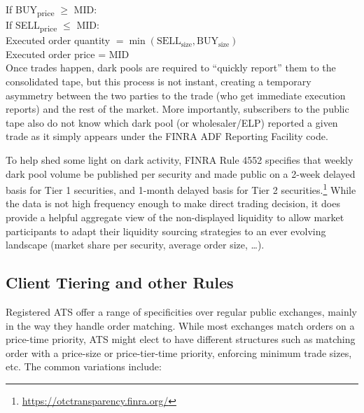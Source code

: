 \noindent If BUY\textsubscript{price} $\geq$ MID: \\
\indent If SELL\textsubscript{price} $\leq$ MID: \\
\indent\indent Executed order quantity $= \min(\text{SELL}_{\text{size}}, \text{BUY}_{\text{size}})$ \\
\indent\indent Executed order price = MID \\


Once trades happen, dark pools are required to ``quickly report'' them to the consolidated tape, but this process is not instant, creating a temporary asymmetry between the two parties to the trade (who get immediate execution reports) and the rest of the market. More importantly, subscribers to the public tape also do not know which dark pool (or wholesaler/ELP) reported a given trade as it simply appears under the FINRA ADF Reporting Facility code.


To help shed some light on dark activity, FINRA Rule 4552 specifies that weekly dark pool volume be published per security and made public on a 2-week delayed basis for Tier 1 securities, and 1-month delayed basis for Tier 2 securities.\footnote{\url{https://otctransparency.finra.org/}} While the data is not high frequency enough to make direct trading decision, it does provide a helpful aggregate view of the non-displayed liquidity to allow market participants to adapt their liquidity sourcing strategies to an ever evolving landscape (market share per security, average order size, \dots).



\subsection{Client Tiering and other Rules}


Registered ATS offer a range of specificities over regular public exchanges, mainly in the way they handle order matching. While most exchanges match orders on a price-time priority, ATS might elect to have different structures such as matching order with a price-size or price-tier-time priority, enforcing minimum trade sizes, etc. The common variations include:


